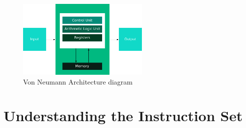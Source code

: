 \documentclass[a4paper, 11pt]{article}
\begin{document}
\begin{figure}[H]
    \centering
    \includegraphics[width =0.57\textwidth]{Images/von-neuman-arch.png}
    \caption{Von Neumann Architecture diagram}
    \label{fig:vn-arch}
\end{figure}

\section{Understanding the Instruction Set}
\end{document}
